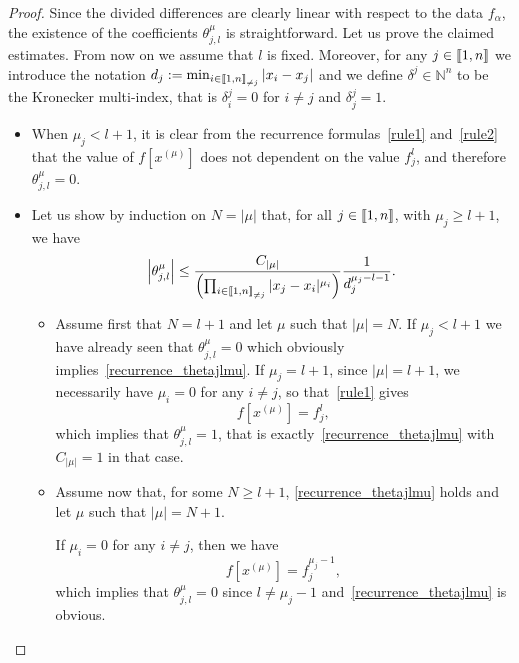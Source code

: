 \documentclass[10pt]{amsart}
\theoremstyle{definition}\newtheorem{defi}[theo]{Definition}\newtheorem{rema}[theo]{Remark}\newtheorem{exam}[theo]{Example}\newtheorem{exem}[theo]{Example}\newtheorem{nota}[theo]{Notation}
\newcommand{\llbracket}{\mathopen{[\mkern -2.7mu[}}
\newcommand{\rrbracket}{\mathclose{]\mkern -2.7mu]}}
\newcommand{\inter}[2]{\llbracket #1,#2 \rrbracket}
\newcommand{\interexclu}[3]{\llbracket #1,#2\rrbracket_{\neq #3}}
\newcommand{\N}{\mathbb{N}}
\begin{document}
\begin{proof}
Since the divided differences are clearly linear with respect to the data $f_\alpha$, the existence of the coefficients $\theta_{j,l}^\mu$ is straightforward. Let us prove the claimed estimates. From now on we assume that $l$ is fixed. Moreover, for any $j\in \inter{1}{n}$ we introduce the notation $d_j:= \min_{i\in\interexclu{1}{n}{j}} |x_i-x_j|$ and we define $\delta^j\in \N^n$ to be the Kronecker multi-index, that is $\delta_i^j=0$ for $i\neq j$ and $\delta_j^j=1$.
\begin{itemize}
\item When $\mu_j<l+1$, it is clear from the recurrence formulas~\eqref{rule1} and~\eqref{rule2} that the value of $f[x^{(\mu)}]$ does not dependent on the value $f_j^l$, and therefore $\theta_{j,l}^\mu=0$.
\item Let us show by induction on $N=|\mu|$ that, for all $j\in \inter{1}{n}$, with $\mu_j\geq l+1$, we have
\begin{equation}\label{recurrence_thetajlmu}
\left|\theta_{j,l}^\mu\right| \leq \frac{C_{|\mu|}}{\left(\prod_{i\in\interexclu{1}{n}{j}} |x_j-x_i|^{\mu_i}\right)} \frac{1}{d_j^{\mu_j-l-1}}.
\end{equation}
\begin{itemize}
\item Assume first that $N=l+1$ and let $\mu$ such that $|\mu|=N$. If $\mu_j<l+1$ we have already seen that $\theta_{j,l}^\mu=0$ which obviously implies~\eqref{recurrence_thetajlmu}. If $\mu_j=l+1$, since $|\mu|=l+1$, we necessarily have $\mu_i=0$ for any $i\neq j$, so that~\eqref{rule1} gives
\[
f\left[x^{(\mu)}\right] = f_j^l,
\]
which implies that $\theta_{j,l}^\mu=1$, that is exactly~\eqref{recurrence_thetajlmu} with $C_{|\mu|}=1$ in that case.
\item Assume now that, for some $N\geq l+1$, \eqref{recurrence_thetajlmu} holds and let $\mu$ such that $|\mu|=N+1$.

If $\mu_i=0$ for any $i\neq j$, then we have
\[
f\left[x^{(\mu)}\right] = f_j^{\mu_j-1},
\]
which implies that $\theta_{j,l}^\mu=0$ since $l\neq \mu_j-1$ and~\eqref{recurrence_thetajlmu} is obvious.


\end{itemize}
\end{itemize}
\end{proof}
\end{document}
